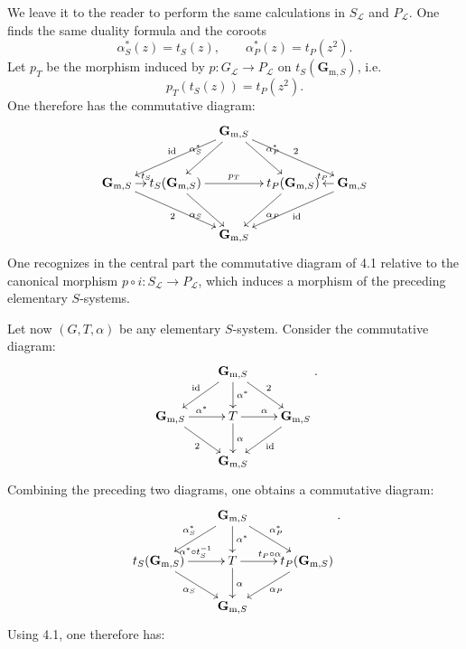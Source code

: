  We leave it to the reader to perform the same calculations in $S_{\mathcal L}$ and $P_{\mathcal L}$. One finds the same duality formula and the coroots
\[
\alpha_S^*(z)=t_S(z),\qquad\alpha_P^*(z)=t_P(z^2).
\]
Let $p_T$ be the morphism induced by $p:G_{\mathcal L}\to P_{\mathcal L}$ on $t_S(\mathbf G_{\mathrm m,S})$, i.e.
\[
p_T(t_S(z))=t_P(z^2).
\]
One therefore has the commutative diagram:{\renewcommand{\thefootnote}{(33)}}
\[
\xymatrix@C=0.8em@R=2.5em{
&&\mathbf G_{\mathrm m,S}\ar[dll]_{\mathrm{id}}\ar[dl]_{\alpha_S^*}\ar[dr]^{\alpha_P^*}\ar[drr]^2&&\\
\mathbf G_{\mathrm m,S}\ar[r]^{t_S}\ar[drr]_2&t_S(\mathbf G_{\mathrm m,S})\ar[rr]^{p_T}\ar[dr]_{\alpha_S}&&t_P(\mathbf G_{\mathrm m,S})\ar[dl]^{\alpha_P}&\mathbf G_{\mathrm m,S}\ar[l]_{t_P}\ar[dll]^{\mathrm{id}}\\
&&\mathbf G_{\mathrm m,S}&&
}
\]
One recognizes in the central part the commutative diagram of 4.1{\renewcommand{\thefootnote}{(34)}} relative to the canonical morphism $p\circ i:S_{\mathcal L}\to P_{\mathcal L}$, which induces a morphism of the preceding elementary $S$-systems.

 Let now $(G,T,\alpha)$ be any elementary $S$-system. Consider the commutative diagram:
\[
\xymatrix@C=2em@R=2em{
&\mathbf G_{\mathrm m,S}\ar[dl]_{\mathrm{id}}\ar[d]^{\alpha^*}\ar[dr]^2&\\
\mathbf G_{\mathrm m,S}\ar[r]^{\alpha^*}\ar[dr]_2&T\ar[r]^\alpha\ar[d]^\alpha&\mathbf G_{\mathrm m,S}\ar[dl]^{\mathrm{id}}\\
&\mathbf G_{\mathrm m,S}&
}.
\]
Combining the preceding two diagrams, one obtains a commutative diagram:
\[
\xymatrix@C=2em@R=2em{
&\mathbf G_{\mathrm m,S}\ar[dl]_{\alpha_S^*}\ar[d]^{\alpha^*}\ar[dr]^{\alpha_P^*}&\\
t_S(\mathbf G_{\mathrm m,S})\ar[r]^{\alpha^*\circ t_S^{-1}}\ar[dr]_{\alpha_S}&T\ar[r]^{t_P\circ\alpha}\ar[d]^\alpha&t_P(\mathbf G_{\mathrm m,S})\ar[dl]^{\alpha_P}\\
&\mathbf G_{\mathrm m,S}&
}.
\]
Using 4.1, one therefore has:

